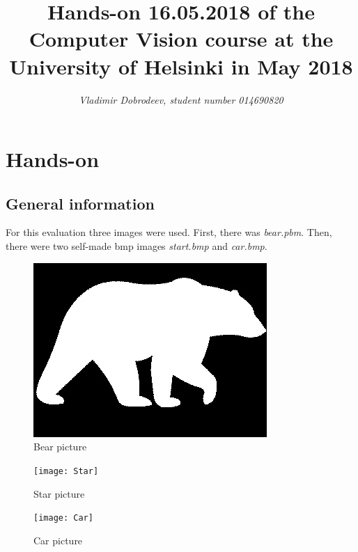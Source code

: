 \documentclass{article}
\begin{document}
\title{Hands-on 16.05.2018 of the Computer Vision course at the
  University of Helsinki in May 2018}

\author{\emph{Vladimir Dobrodeev, student number 014690820}}
\maketitle

\newpage

\section{Hands-on}

\subsection{General information}

For this evaluation three images were used. First, there was \textit{bear.pbm}. Then, there were two self-made bmp images \textit{start.bmp} and \textit{car.bmp}.

\begin{figure}[H]
\centering
\includegraphics[width=\textwidth]{Bear}
\caption{Bear picture}
\end{figure}

\begin{figure}[H]
\centering
\texttt{[image: Star]}
\caption{Star picture}
\end{figure}

\begin{figure}[H]
\centering
\texttt{[image: Car]}
\caption{Car picture}
\end{figure}
\end{document}
